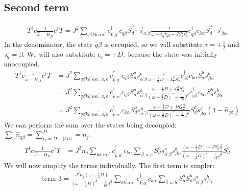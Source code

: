 \documentclass{revtex4-2}
\numberwithin{equation}{section}
\begin{document}
\subsection{Second term}
\begin{align}
	T^\dagger c \frac{1}{\hat \omega - H_D}c^\dagger T = J^2\sum_{q\beta k k^\prime \alpha \alpha^\prime} c^\dagger_{k^\prime\alpha^\prime} c_{q\beta} \vec{S_d}\cdot\vec{s}_{\alpha^\prime \beta } \frac{1}{\omega - \epsilon_q\tau_{q\beta} - J S_d^z s_q^z}c^\dagger_{q\beta} c_{k\alpha} \vec{S_d}\cdot\vec{s}_{ \beta\alpha}
\end{align}
In the denominator, the state \(q\beta\) is occupied, so we will substitute \(\tau = + \frac{1}{2}\) and \(s_q^z = \beta\). We will also substitute \(\epsilon_q = +D\), because the state was initially unoccupied.
\begin{align}
	T^\dagger c \frac{1}{\hat \omega - H_D}c^\dagger T &= J^2\sum_{q\beta k k^\prime \alpha \alpha^\prime,a,b} c^\dagger_{k^\prime\alpha^\prime} c_{q\beta} S_d^a s^a_{\alpha^\prime \beta} \frac{1}{\omega - \frac{1}{2}D - J \frac{\beta}{2}S_d^z}c^\dagger_{q\beta} c_{k\alpha} S_d^b s^b_{\beta \alpha} \\
	&= J^2\sum_{q\beta k k^\prime \alpha \alpha^\prime,a,b} c^\dagger_{k^\prime\alpha^\prime} c_{q\beta} S_d^a s^a_{\alpha^\prime \beta} \frac{\omega - \frac{1}{2}D + J \frac{\beta}{2}S_d^z }{\left(\omega - \frac{1}{2}D\right)^2 - \frac{1}{16}J^2}c^\dagger_{q\beta} c_{k\alpha} S_d^b s^b_{\beta \alpha} \\
	&= J^2\sum_{q\beta k k^\prime \alpha \alpha^\prime,a,b} c^\dagger_{k^\prime\alpha^\prime} c_{k\alpha} S_d^a s^a_{\alpha^\prime \beta} \frac{\omega - \frac{1}{2}D  +  J S_d^z \frac{\beta}{2}}{\left(\omega - \frac{1}{2}D\right)^2 - \frac{1}{16}J^2} S_d^b s^b_{\beta \alpha} \left(1 - \hat n_{q\beta}\right)
\end{align}
We can perform the sum over the states being decoupled: \(\sum_q \hat n_{q\beta} = \sum_{\epsilon_q = D - |\delta D|}^D = n_j \).
\begin{align}
	T^\dagger c \frac{1}{\hat \omega - H_D}c^\dagger T &= J^2 n_j \sum_{k k^\prime \alpha \alpha^\prime} c^\dagger_{k^\prime\alpha^\prime} c_{k\alpha} \sum_{\beta,a,b}S_d^a s^a_{\alpha^\prime \beta}s^b_{\beta \alpha} \frac{\left(\omega - \frac{1}{2}D\right) + J S_d^z \frac{\beta}{2}}{\left(\omega - \frac{1}{2}D\right)^2 - \frac{1}{16}J^2} S_d^b
\end{align}
We will now simplify the terms individually. The first term is simpler:
\begin{equation}\begin{aligned}
	\text{term 3} = \frac{J^2 n_j \left(\omega - \frac{1}{2}D\right)}{\left(\omega - \frac{1}{2}D\right)^2 - \frac{1}{16}J^2}\sum_{k k^\prime \alpha \alpha^\prime} c^\dagger_{k^\prime\alpha^\prime} c_{k\alpha} \sum_{\beta,a,b}S_d^a S_d^b s^a_{\alpha^\prime \beta}s^b_{\beta \alpha}
\end{aligned}\end{equation}
\end{document}
